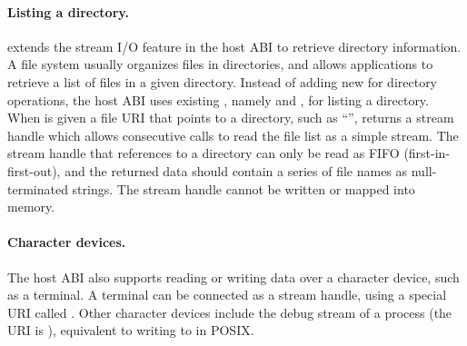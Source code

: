 

\paragraph{Listing a directory.}
\graphene{} extends the stream I/O feature in the host ABI to retrieve directory information.
A file system usually organizes files in directories,
and allows applications to retrieve a list of files in a given directory.
Instead of adding new \hostapis{} for directory operations,
the host ABI uses existing \hostapis{}, namely  and ,
for listing a directory.
When  is given a file URI that points to a directory,
such as ``'',
 returns a stream handle
which allows consecutive  calls to read the file list
as a simple stream.
The stream handle that references to a directory can only be read as FIFO (first-in-first-out),
and the returned data should contain a series of file names as null-terminated strings.
The stream handle cannot be written or mapped into memory.







\paragraph{Character devices.}
The host ABI also supports reading or writing data over a character device, such as a terminal.
A terminal can be connected as a stream handle,
using a special URI called .
Other character devices include the debug stream of a process (the URI is ),
equivalent to writing to  in POSIX.




